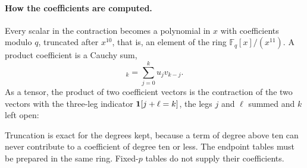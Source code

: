\paragraph{How the coefficients are computed.} Every scalar in the contraction becomes a polynomial in $x$ with coefficients modulo $q$, truncated after $x^{10}$, that is, an element of the ring $\mathbb F_q[x]/(x^{11})$. A product coefficient is a Cauchy sum,
\begin{equation}
 [uv]_k=\sum_{j=0}^k u_jv_{k-j}.
 \label{eq:cauchy}
\end{equation}
As a tensor, the product of two coefficient vectors is the contraction of the two vectors with the three-leg indicator $\mathbf1\!\left[j+\ell=k\right]$, the legs $j$ and $\ell$ summed and $k$ left open:
{\color{black}
\begin{center}
\end{center}}
Truncation is exact for the degrees kept, because a term of degree above ten can never contribute to a coefficient of degree ten or less. The endpoint tables must be prepared in the same ring. Fixed-$p$ tables do not supply their coefficients.

